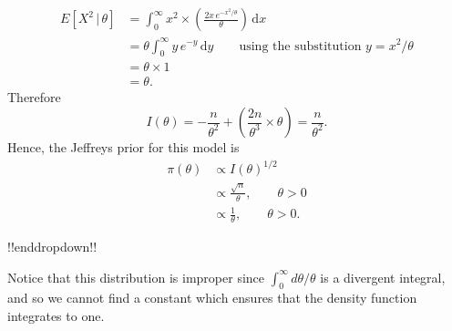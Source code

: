 {\begin{align*}
        E\left[X^2 \,| \, \theta\right]
        &=\int_0^\infty x^2\times
        \left(\frac{2x\,e^{-x^2/\theta}}{\theta}\right)\, \mathrm{d}x \\
        &=\theta\int_0^\infty y\,e^{-y}\,\mathrm{d}y 
        \quad\quad\text{using the substitution } y=x^2/\theta \\
        &=\theta\times 1 \\
        &=\theta.
        \end{align*}
        Therefore
        $$
        I(\theta)
        =-\frac{n}{\theta^2}+\left(\frac{2n}{\theta^3}\times\theta\right) 
        =\frac{n}{\theta^2}.
        $$
        Hence, the Jeffreys prior for this model is
        \begin{align*}
        \pi(\theta)&\propto I(\theta)^{1/2} \\
        &\propto \frac{\sqrt{n}}{\theta},\quad\quad\theta>0 \\
        &\propto \frac{1}{\theta},\quad\quad\theta>0.
        \end{align*}

!!enddropdown!!


Notice that this distribution is improper since $\int_0^\infty d\theta/\theta$ is a divergent integral, and so we cannot find a constant which ensures that the density function integrates to one.}

\clearpage

